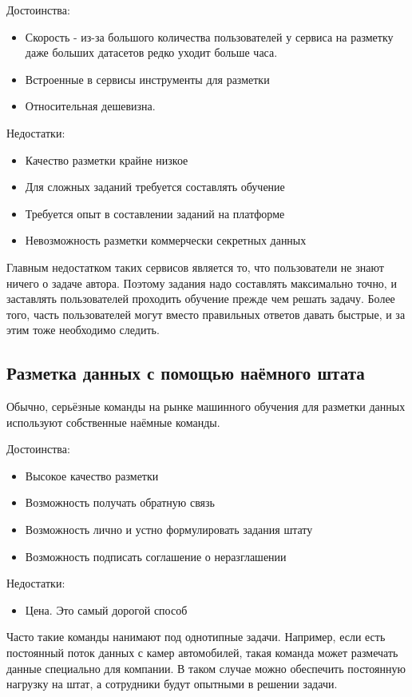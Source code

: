 Достоинства:
\begin{itemize}
    \item Скорость - из-за большого количества пользователей у сервиса на разметку даже больших датасетов редко уходит больше часа.
    \item Встроенные в сервисы инструменты для разметки
    \item Относительная дешевизна.
\end{itemize}
Недостатки:
\begin{itemize}
    \item Качество разметки крайне низкое
    \item Для сложных заданий требуется составлять обучение
    \item Требуется опыт в составлении заданий на платформе
    \item Невозможность разметки коммерчески секретных данных
\end{itemize}
Главным недостатком таких сервисов является то, что пользователи не знают ничего о задаче автора. Поэтому задания надо составлять максимально точно, и заставлять пользователей проходить обучение прежде чем решать задачу. Более того, часть пользователей могут вместо правильных ответов давать быстрые, и за этим тоже необходимо следить.

\subsection{Разметка данных с помощью наёмного штата} \label{subsect1_4_3}
Обычно, серьёзные команды на рынке машинного обучения для разметки данных используют собственные наёмные команды.

Достоинства:
\begin{itemize}
    \item Высокое качество разметки
    \item Возможность получать обратную связь
    \item Возможность лично и устно формулировать задания штату
    \item Возможность подписать соглашение о неразглашении
\end{itemize}
Недостатки:
\begin{itemize}
    \item Цена. Это самый дорогой способ
\end{itemize}
Часто такие команды нанимают под однотипные задачи. Например, если есть постоянный поток данных с камер автомобилей, такая команда может размечать данные специально для компании. В таком случае можно обеспечить постоянную нагрузку на штат, а сотрудники будут опытными в решении задачи.